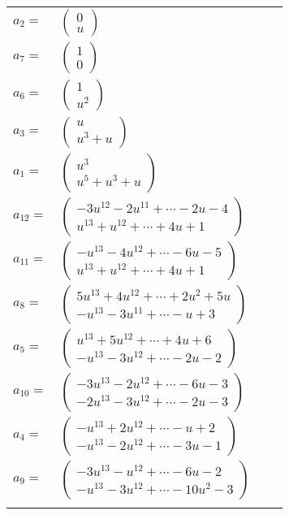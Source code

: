 \documentclass[1p]{elsarticle_modified}
\theoremstyle{definition}
\begin{document}
\begin{tabular}{m{7pt} m{180pt} m{7pt} m{180pt} }
\flushright $a_{2}=$&$\begin{pmatrix}0\\u\end{pmatrix}$ \\
\flushright $a_{7}=$&$\begin{pmatrix}1\\0\end{pmatrix}$ \\
\flushright $a_{6}=$&$\begin{pmatrix}1\\u^2\end{pmatrix}$ \\
\flushright $a_{3}=$&$\begin{pmatrix}u\\u^3+u\end{pmatrix}$ \\
\flushright $a_{1}=$&$\begin{pmatrix}u^3\\u^5+u^3+u\end{pmatrix}$ \\
\flushright $a_{12}=$&$\begin{pmatrix}-3 u^{12}-2 u^{11}+\cdots-2 u-4\\u^{13}+u^{12}+\cdots+4 u+1\end{pmatrix}$ \\
\flushright $a_{11}=$&$\begin{pmatrix}- u^{13}-4 u^{12}+\cdots-6 u-5\\u^{13}+u^{12}+\cdots+4 u+1\end{pmatrix}$ \\
\flushright $a_{8}=$&$\begin{pmatrix}5 u^{13}+4 u^{12}+\cdots+2 u^2+5 u\\- u^{13}-3 u^{11}+\cdots- u+3\end{pmatrix}$ \\
\flushright $a_{5}=$&$\begin{pmatrix}u^{13}+5 u^{12}+\cdots+4 u+6\\- u^{13}-3 u^{12}+\cdots-2 u-2\end{pmatrix}$ \\
\flushright $a_{10}=$&$\begin{pmatrix}-3 u^{13}-2 u^{12}+\cdots-6 u-3\\-2 u^{13}-3 u^{12}+\cdots-2 u-3\end{pmatrix}$ \\
\flushright $a_{4}=$&$\begin{pmatrix}- u^{13}+2 u^{12}+\cdots- u+2\\- u^{13}-2 u^{12}+\cdots-3 u-1\end{pmatrix}$ \\
\flushright $a_{9}=$&$\begin{pmatrix}-3 u^{13}- u^{12}+\cdots-6 u-2\\- u^{13}-3 u^{12}+\cdots-10 u^2-3\end{pmatrix}$\\&\end{tabular}
\end{document}
